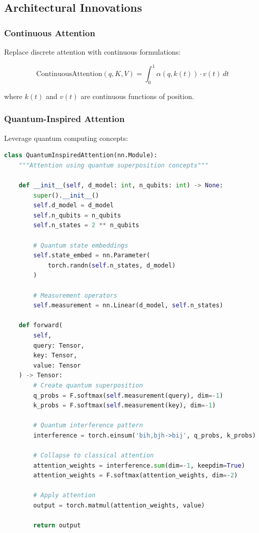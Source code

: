 \documentclass[11pt]{article}
\begin{document}
\subsection{Architectural Innovations}

\subsubsection{Continuous Attention}

Replace discrete attention with continuous formulations:

\begin{equation}
\text{ContinuousAttention}(q, K, V) = \int_{0}^{1} \alpha(q, k(t)) \cdot v(t) \, dt
\end{equation}

where $k(t)$ and $v(t)$ are continuous functions of position.

\subsubsection{Quantum-Inspired Attention}

Leverage quantum computing concepts:

\begin{lstlisting}[language=Python, caption=Quantum-Inspired Attention Concept]
class QuantumInspiredAttention(nn.Module):
    """Attention using quantum superposition concepts"""
    
    def __init__(self, d_model: int, n_qubits: int) -> None:
        super().__init__()
        self.d_model = d_model
        self.n_qubits = n_qubits
        self.n_states = 2 ** n_qubits
        
        # Quantum state embeddings
        self.state_embed = nn.Parameter(
            torch.randn(self.n_states, d_model)
        )
        
        # Measurement operators
        self.measurement = nn.Linear(d_model, self.n_states)
        
    def forward(
        self,
        query: Tensor,
        key: Tensor,
        value: Tensor
    ) -> Tensor:
        # Create quantum superposition
        q_probs = F.softmax(self.measurement(query), dim=-1)
        k_probs = F.softmax(self.measurement(key), dim=-1)
        
        # Quantum interference pattern
        interference = torch.einsum('bih,bjh->bij', q_probs, k_probs)
        
        # Collapse to classical attention
        attention_weights = interference.sum(dim=-1, keepdim=True)
        attention_weights = F.softmax(attention_weights, dim=-2)
        
        # Apply attention
        output = torch.matmul(attention_weights, value)
        
        return output
\end{lstlisting}
\end{document}
